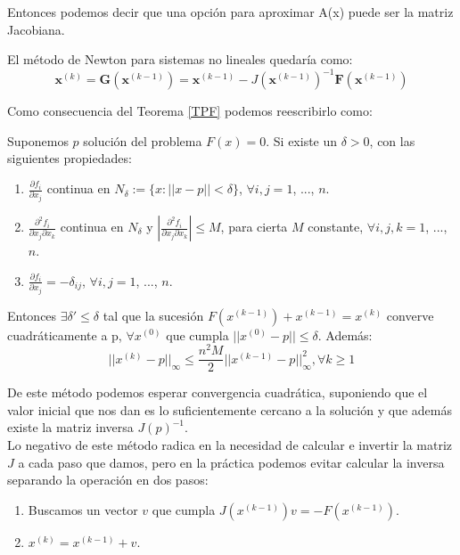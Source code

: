 Entonces podemos decir que una opción para aproximar A(x) puede ser la matriz Jacobiana.

El método de Newton para sistemas no lineales quedaría como:
\[\mathbf{x}^{(k)}=\mathbf{G}\left(\mathbf{x}^{(k-1)}\right)=\mathbf{x}^{(k-1)}-J\left(\mathbf{x}^{(k-1)}\right)^{-1} \mathbf{F}\left(\mathbf{x}^{(k-1)}\right)\]

Como consecuencia del Teorema \ref{TPF} podemos reescribirlo como:
\begin{corollary}
	Suponemos $p$ solución del problema $F(x) = 0$. Si existe un $\delta > 0$, con las siguientes propiedades:
	\begin{enumerate}
		\item $\frac{\partial f_i}{\partial x_j}$ continua en $N_\delta := \{x : ||x-p|| < \delta\}$, $\forall i , j = 1$, ..., $n$.
		\item $\frac{\partial^2 f_i}{\partial x_j\partial x_k}$ continua en $N_\delta$ y $\left|\frac{\partial^2 f_i}{\partial x_j\partial x_k}\right| \leq M$, para cierta $M$ constante, $\forall i , j , k = 1$, ..., $n$.
		\item $\frac{\partial f_i}{\partial x_j} = -\delta_{ij}$, $\forall i , j = 1$, ..., $n$.
	\end{enumerate}

	Entonces $\exists \delta' \leq \delta$ tal que la sucesión $F(x^{(k-1)}) + x^{(k-1)} = x^{(k)}$ converve cuadráticamente a p, $\forall x^{(0)}$ que cumpla $||x^{(0)}-p|| \leq \delta$. Además:
	\[||x^{(k)}-p||_\infty \leq \frac{n^2 M}{2} ||x^{(k-1)}-p||^2_\infty, \forall k \geq 1\]
\end{corollary}

De este método podemos esperar convergencia cuadrática, suponiendo que el valor inicial que nos dan es lo suficientemente cercano a la solución y que además existe la matriz inversa $J(p)^{-1}$. \\
Lo negativo de este método radica en la necesidad de calcular e invertir la matriz $J$ a cada paso que damos, pero en la práctica podemos evitar calcular la inversa separando la operación en dos pasos:
\begin{enumerate}
	\item Buscamos un vector $v$ que cumpla $J(x^{(k-1)})v = -F(x^{(k-1)})$.
	\item $x^{(k)} = x^{(k-1)} + v$.
\end{enumerate}
